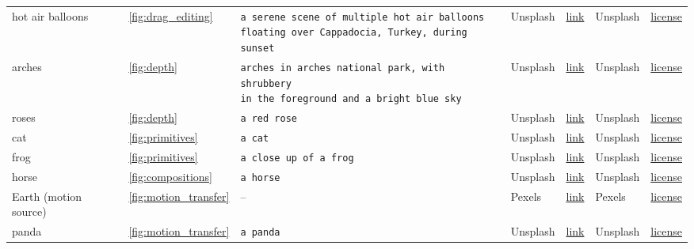 \begin{table}[t]
\begin{center}
{\begin{tabular}{@{\hspace{3mm}}lllllll}
    hot air balloons & \cref{fig:drag_editing} & \makecell[l]{\texttt{a serene scene of multiple hot air balloons} \\ \texttt{floating over Cappadocia, Turkey, during sunset}} & Unsplash & \href{https://unsplash.com/photos/a-bunch-of-hot-air-balloons-flying-in-the-sky-UeX_qw9lnzc}{link} & Unsplash & \href{https://unsplash.com/license}{license} \\ \cmidrule(lr){1-7}
    
    arches & \cref{fig:depth} & \makecell[l]{\texttt{arches in arches national park, with shrubbery} \\ \texttt{in the foreground and a bright blue sky}} & Unsplash & \href{https://unsplash.com/photos/arches-national-park-utah-during-daytime-Aydu-0d4Iwc}{link} & Unsplash & \href{https://unsplash.com/license}{license} \\ \cmidrule(lr){1-7}
    
    roses & \cref{fig:depth} & \texttt{a red rose} & Unsplash & \href{https://unsplash.com/photos/shallow-focus-photography-of-red-flower-LZCGRSQxn6E}{link} & Unsplash & \href{https://unsplash.com/license}{license} \\ \cmidrule(lr){1-7}
    
    cat & \cref{fig:primitives} & \texttt{a cat} & Unsplash & \href{https://unsplash.com/photos/white-and-gray-cat-IFxjDdqK_0U}{link} & Unsplash & \href{https://unsplash.com/license}{license} \\ \cmidrule(lr){1-7}
    
    frog & \cref{fig:primitives} & \texttt{a close up of a frog} & Unsplash & \href{https://unsplash.com/photos/brown-frog-in-close-up-photography-8GQ5ELnU-rM}{link} & Unsplash & \href{https://unsplash.com/license}{license} \\ \cmidrule(lr){1-7}
    
    horse & \cref{fig:compositions} & \texttt{a horse} & Unsplash & \href{https://unsplash.com/photos/shallow-focus-photography-of-black-donkey-vUpXnK5ufwg}{link} & Unsplash & \href{https://unsplash.com/license}{license} \\ \cmidrule(lr){1-7}
    
    Earth (motion source) & \cref{fig:motion_transfer} & \;-- & Pexels & \href{https://www.pexels.com/video/digital-animation-of-planet-earth-10880732/}{link} & Pexels & \href{https://www.pexels.com/license/}{license} \\ \cmidrule(lr){1-7}
    
    panda & \cref{fig:motion_transfer} & \texttt{a panda} & Unsplash & \href{https://unsplash.com/photos/a-panda-bear-in-the-grass-ScHhzUSG2x8}{link} & Unsplash & \href{https://unsplash.com/license}{license} \\ \cmidrule(lr){1-7}
    

\end{tabular}}
\end{center}
\end{table}
